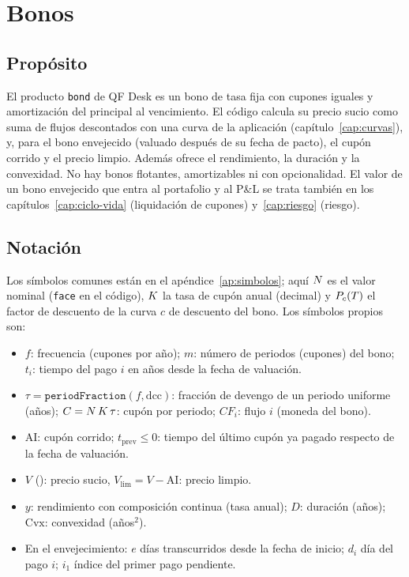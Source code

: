 \chapter{Bonos}\label{cap:bonos}

\section{Propósito}\label{sec:cap06-proposito}

El producto \texttt{bond} de QF Desk es un bono de tasa fija con cupones iguales y amortización del principal
al vencimiento. El código calcula su precio sucio como suma de flujos descontados con una curva de la
aplicación (capítulo~\ref{cap:curvas}), y, para el bono envejecido (valuado después de su fecha de pacto), el
cupón corrido y el precio limpio. Además ofrece el rendimiento, la duración y la convexidad. No hay bonos
flotantes, amortizables ni con opcionalidad. El valor de un bono envejecido que entra al portafolio y al
P\&L se trata también en los capítulos~\ref{cap:ciclo-vida} (liquidación de cupones) y~\ref{cap:riesgo}
(riesgo).

\section{Notación}\label{sec:cap06-notacion}

Los símbolos comunes están en el apéndice~\ref{ap:simbolos}; aquí $N$ es el valor nominal (\texttt{face} en
el código), $K$ la tasa de cupón anual (decimal) y $P_{c}(T)$ el factor de descuento de la curva $c$ de
descuento del bono. Los símbolos propios son:
\begin{itemize}
  \item $f$: frecuencia (cupones por año); $m$: número de periodos (cupones) del bono; $t_i$: tiempo del pago
        $i$ en años desde la fecha de valuación.
  \item $\tau=\texttt{periodFraction}(f,\mathrm{dcc})$: fracción de devengo de un periodo uniforme (años);
        $C=N\,K\,\tau$: cupón por periodo; $\mathit{CF}_i$: flujo $i$ (moneda del bono).
  \item $\mathrm{AI}$: cupón corrido; $t_{\mathrm{prev}}\le0$: tiempo del último cupón ya pagado respecto de la
        fecha de valuación.
  \item $V$ (\PV): precio sucio, $V_{\mathrm{lim}}=V-\mathrm{AI}$: precio limpio.
  \item $y$: rendimiento con composición continua (tasa anual); $D$: duración (años); $\mathrm{Cvx}$:
        convexidad (años$^{2}$).
  \item En el envejecimiento: $e$ días transcurridos desde la fecha de inicio; $d_i$ día del pago $i$; $i_1$
        índice del primer pago pendiente.
\end{itemize}

